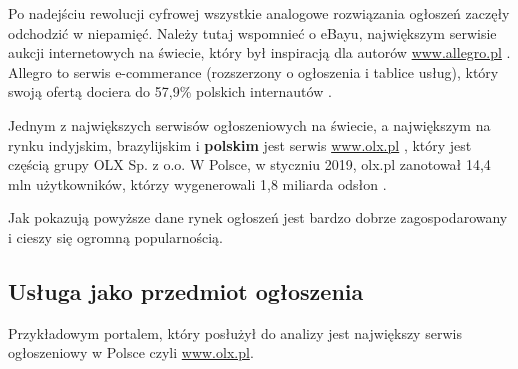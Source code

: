 \documentclass[12pt]{article}
\numberwithin{figure}{section}
\begin{document}
\begin{sloppypar}
Po nadejściu rewolucji cyfrowej wszystkie analogowe rozwiązania ogłoszeń zaczęły odchodzić w niepamięć. Należy tutaj wspomnieć o eBayu, największym serwisie aukcji internetowych na świecie, który był inspiracją dla autorów \url{www.allegro.pl} \cite{allegro-wywiad}. Allegro to serwis e-commerance (rozszerzony o ogłoszenia i tablice usług), który swoją ofertą dociera do 57,9\% polskich internautów \cite{allegro-liczby}. 

Jednym z największych serwisów ogłoszeniowych na świecie, a największym na rynku indyjskim, brazylijskim i \textbf{polskim} jest serwis \url{www.olx.pl} \cite{olx-wywiad}, który jest częścią grupy OLX Sp. z o.o. W Polsce, w styczniu 2019, olx.pl zanotował 14,4 mln użytkowników, którzy wygenerowali 1,8 miliarda odsłon \cite{olx-liczby}.

Jak pokazują powyższe dane rynek ogłoszeń jest bardzo dobrze zagospodarowany i cieszy się ogromną popularnością.
\subsection{Usługa jako przedmiot ogłoszenia}
Przykładowym portalem, który posłużył do analizy jest największy serwis ogłoszeniowy w Polsce czyli \url{www.olx.pl}.


\end{sloppypar}
\end{document}
